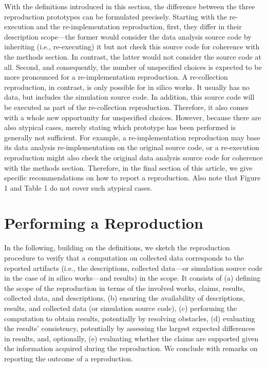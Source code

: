 \documentclass[authordate, meta]{jote-new-article}
\begin{document}
	With the definitions introduced in this section, the difference between the three reproduction prototypes can be formulated precisely. Starting with the re-execution and the re-implementation reproduction, first, they differ in their description scope—the former would consider the data analysis source code by inheriting (i.e., re-executing) it but not check this source code for coherence with the methods section. In contrast, the latter would not consider the source code at all. Second, and consequently, the number of unspecified choices is expected to be more pronounced for a re-implementation reproduction. A re-collection reproduction, in contrast, is only possible for in silico works. It usually has no data, but includes the simulation source code. In addition, this source code will be executed as part of the re-collection reproduction. Therefore, it also comes with a whole new opportunity for unspecified choices. However, because there are also atypical cases, merely stating which prototype has been performed is generally not sufficient. For example, a re-implementation reproduction may base its data analysis re-implementation on the original source code, or a re-execution reproduction might also check the original data analysis source code for coherence with the methods section. Therefore, in the final section of this article, we give specific recommendations on how to report a reproduction. Also note that Figure 1 and Table 1 do not cover such atypical cases.
	\section{Performing a Reproduction}

	In the following, building on the definitions, we sketch the reproduction procedure to verify that a computation on collected data corresponds to the reported artifacts (i.e., the descriptions, collected data—or simulation source code in the case of in silico works—and results) in the scope. It consists of (a) defining the scope of the reproduction in terms of the involved works, claims, results, collected data, and descriptions, (b) ensuring the availability of descriptions, results, and collected data (or simulation source code), (c) performing the computation to obtain results, potentially by resolving obstacles, (d) evaluating the results' consistency, potentially by assessing the largest expected differences in results, and, optionally, (e) evaluating whether the claims are supported given the information acquired during the reproduction. We conclude with remarks on reporting the outcome of a reproduction.
\end{document}

